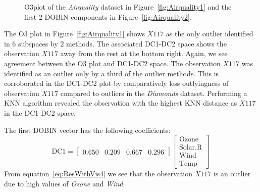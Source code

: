 \documentclass[letter,12pt]{article}
\begin{document}
\begin{figure}[!ht]
	\centering
	\hfill
	\caption{O3plot of the \textit{Airquality} dataset in Figure~\ref{fig:Airquality1} and the first 2 DOBIN components in Figure~\ref{fig:Airquality2}.}
	\label{fig:Airquality}
\end{figure}
The O3 plot in Figure~\ref{fig:Airquality1} shows $X117$ as the only outlier identified in $6$ subspaces by $2$ methods. The associated DC1-DC2 space shows the observation $X117$ away from the rest at the bottom right. Again, we see agreement between the O3 plot and DC1-DC2 space. The observation $X117$ was identified as an outlier only by a third of the outlier methods. This is corroborated in the DC1-DC2 plot by comparatively less outlyingness of observation $X117$ compared to outliers in the \textit{Diamonds} dataset. Performing a KNN algorithm revealed the observation with the highest KNN distance as $X117$ in the DC1-DC2 space.

The first DOBIN vector has the following coefficients:
{\color{blue}
\begin{equation}\label{eq:ResWithVis4}
	\text{DC1} = \begin{bmatrix}
	0.650 & 0.209 & 0.667 & 0.296
	\end{bmatrix}
	\begin{bmatrix}
		\text{Ozone}   \\
		\text{Solar.R} \\
		\text{Wind}    \\
		\text{Temp}
	\end{bmatrix} \,
\end{equation}}
From equation~\eqref{eq:ResWithVis4} we see that the observation $X117$ is an outlier due to high values of \textit{Ozone} and \textit{Wind}.
\end{document}
